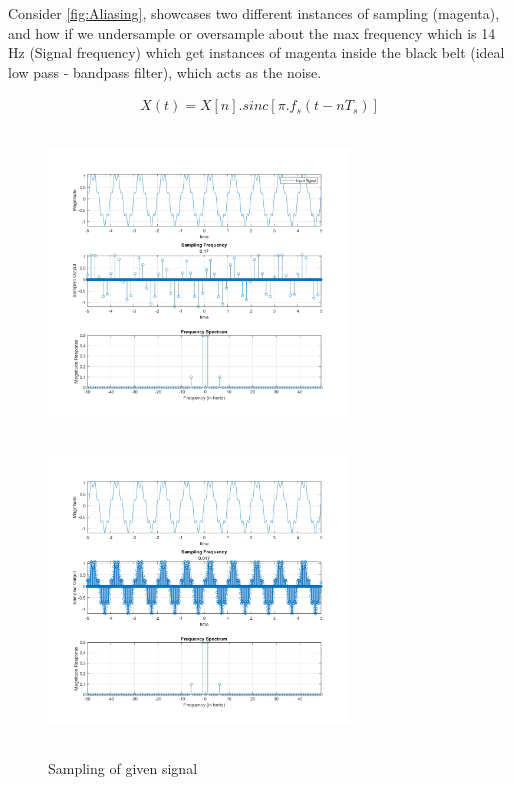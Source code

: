 \documentclass{article}
\begin{document}
Consider \ref{fig:Aliasing}, showcases two different instances of sampling (magenta), and how if we undersample or oversample about the max frequency which is 14 Hz (Signal frequency) which get instances of magenta inside the black belt (ideal low pass - bandpass filter), which acts as the noise.

\begin{equation}
\begin{aligned}
    X(t) = X[n].sinc[\pi.f_s(t - nT_s)]
\end{aligned}
\end{equation}


\begin{figure}[!htb]
      \includegraphics[width=8cm, height=8cm, angle=0,rotate=0]{figures/Input_Signal_0.17.png}
    \endminipage\hfill
      \includegraphics[width=8cm, height=8cm, angle=0,rotate=0]{figures/Input_Signal_0.017.png}
    \endminipage\hfill
    \caption{Sampling of given signal   }
\end{figure}
\end{document}
